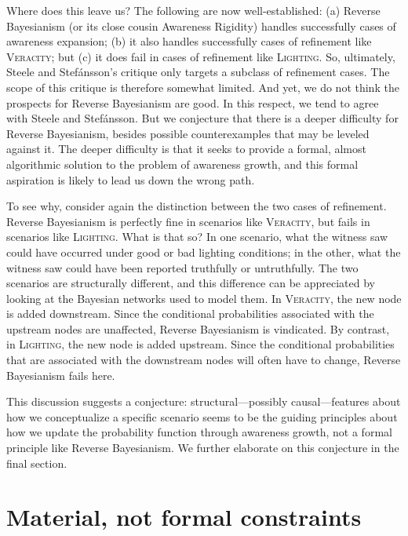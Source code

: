 \documentclass[
  11pt,
  dvipsnames,enabledeprecatedfontcommands]{scrartcl}
\begin{document}
Where does this leave us? The following are now well-established: (a)
Reverse Bayesianism (or its close cousin Awareness Rigidity) handles
successfully cases of awareness expansion; (b) it also handles
successfully cases of refinement like \textsc{Veracity}; but (c) it does
fail in cases of refinement like \textsc{Lighting}. So, ultimately,
Steele and Stefánsson's critique only targets a subclass of refinement
cases. The scope of this critique is therefore somewhat limited. And
yet, we do not think the prospects for Reverse Bayesianism are good. In
this respect, we tend to agree with Steele and Stefánsson. But we
conjecture that there is a deeper difficulty for Reverse Bayesianism,
besides possible counterexamples that may be leveled against it. The
deeper difficulty is that it seeks to provide a formal, almost
algorithmic solution to the problem of awareness growth, and this formal
aspiration is likely to lead us down the wrong path.

To see why, consider again the distinction between the two cases of
refinement. Reverse Bayesianism is perfectly fine in scenarios like
\textsc{Veracity}, but fails in scenarios like \textsc{Lighting}. What
is that so? In one scenario, what the witness saw could have occurred
under good or bad lighting conditions; in the other, what the witness
saw could have been reported truthfully or untruthfully. The two
scenarios are structurally different, and this difference can be
appreciated by looking at the Bayesian networks used to model them. In
\textsc{Veracity}, the new node is added downstream. Since the
conditional probabilities associated with the upstream nodes are
unaffected, Reverse Bayesianism is vindicated. By contrast, in
\textsc{Lighting}, the new node is added upstream. Since the conditional
probabilities that are associated with the downstream nodes will often
have to change, Reverse Bayesianism fails here.

This discussion suggests a conjecture: structural---possibly
causal---features about how we conceptualize a specific scenario seems
to be the guiding principles about how we update the probability
function through awareness growth, not a formal principle like Reverse
Bayesianism. We further elaborate on this conjecture in the final
section.

\hypertarget{material-not-formal-constraints}{%
\section{Material, not formal
constraints}\label{material-not-formal-constraints}}
\end{document}
